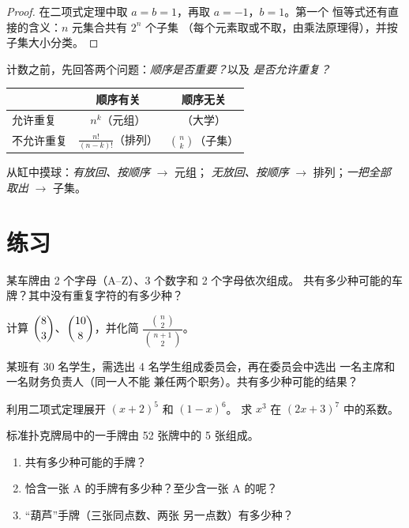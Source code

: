 \begin{proof}
在二项式定理中取 $a = b = 1$，再取 $a = -1$，$b = 1$。第一个
恒等式还有直接的含义：$n$ 元集合共有 $2^n$ 个子集
（每个元素取或不取，由乘法原理得），并按子集大小分类。
\end{proof}

\begin{method}[选取正确的模型]\label{met:g12:comb:model}
计数之前，先回答两个问题：\emph{顺序是否重要？}以及
\emph{是否允许重复？}
\begin{center}
\begin{tabular}{l|cc}
 & 顺序有关 & 顺序无关\\
\hline
允许重复 & $n^k$（元组） & （大学）\\
不允许重复 & $\frac{n!}{(n-k)!}$（排列） & $\binom nk$（子集）
\end{tabular}
\end{center}
从缸中摸球：\emph{有放回、按顺序} $\to$ 元组；
\emph{无放回、按顺序} $\to$ 排列；\emph{一把全部
取出} $\to$ 子集。
\end{method}

\section{练习}

\begin{exercise}[$\star$]\label{exo:g12:comb:1}
某车牌由 2 个字母（A--Z）、3 个数字和 2 个字母依次组成。
共有多少种可能的车牌？其中没有重复字符的有多少种？
\end{exercise}

\begin{exercise}[$\star$]\label{exo:g12:comb:2}
计算 $\dbinom{8}{3}$、$\dbinom{10}{8}$，并化简
$\dfrac{\binom{n}{2}}{\binom{n+1}{2}}$。
\end{exercise}

\begin{exercise}[$\star$]\label{exo:g12:comb:3}
某班有 30 名学生，需选出 4 名学生组成委员会，再在委员会中选出
一名主席和一名财务负责人（同一人不能
兼任两个职务）。共有多少种可能的结果？
\end{exercise}

\begin{exercise}[$\star$]\label{exo:g12:comb:4}
利用二项式定理展开 $(x + 2)^5$ 和 $(1 - x)^6$。
求 $x^3$ 在 $(2x + 3)^7$ 中的系数。
\end{exercise}

\begin{exercise}[$\star\star$]\label{exo:g12:comb:5}
标准扑克牌局中的一手牌由 52 张牌中的 5 张组成。
\begin{enumerate}
  \item 共有多少种可能的手牌？
  \item 恰含一张 A 的手牌有多少种？至少含一张 A 的呢？
  \item “葫芦”手牌（三张同点数、两张
        另一点数）有多少种？
\end{enumerate}
\end{exercise}

